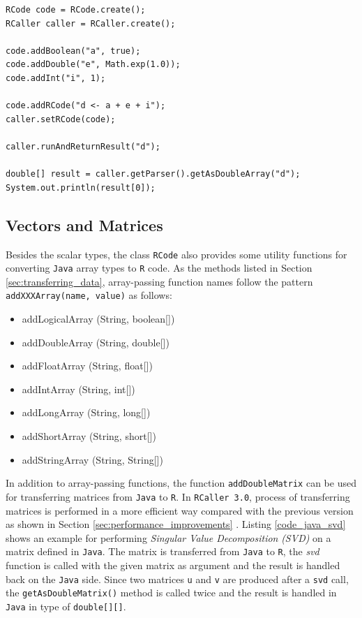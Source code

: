 \documentclass[10pt,a4paper, final, oneside]{article}
\begin{document}
\begin{minipage}{\linewidth}
\begin{lstlisting}[caption=Passing Data,label=code_java_pass_data]
RCode code = RCode.create();
RCaller caller = RCaller.create();
        
code.addBoolean("a", true);
code.addDouble("e", Math.exp(1.0));
code.addInt("i", 1);
        
code.addRCode("d <- a + e + i");
caller.setRCode(code);
       
caller.runAndReturnResult("d");
        
double[] result = caller.getParser().getAsDoubleArray("d");
System.out.println(result[0]);
\end{lstlisting}
\end{minipage}


\subsection{Vectors and Matrices}
\label{sec:vectors_and_matrices}

Besides the scalar types, the class \texttt{RCode} also provides some utility functions for converting \texttt{Java} array types to \texttt{R} code. As the methods listed in Section \ref{sec:transferring_data}, array-passing function names follow the pattern \texttt{addXXXArray(name, value)} as follows:

\begin{itemize}
\item addLogicalArray (String, boolean[])
\item addDoubleArray (String, double[])
\item addFloatArray (String, float[])
\item addIntArray (String, int[])
\item addLongArray (String, long[])
\item addShortArray (String, short[])
\item addStringArray (String, String[])
\end{itemize}

In addition to array-passing functions, the function \texttt{addDoubleMatrix} can be used for transferring matrices from \texttt{Java} to \texttt{R}. In \texttt{RCaller 3.0}, process of transferring matrices is performed in a more efficient way compared with the previous version as shown in Section \ref{sec:performance_improvements} \cite{satman2014rcaller}. Listing \ref{code_java_svd} shows an example for performing \emph{Singular Value Decomposition} \emph{(SVD)} on a matrix defined in \texttt{Java}. The matrix is transferred from \texttt{Java} to \texttt{R}, the \emph{svd} function is called with the given matrix as argument and the result is handled back on the \texttt{Java} side. Since two matrices \texttt{u} and \texttt{v} are produced after a \texttt{svd} call, the \texttt{getAsDoubleMatrix()} method is called twice and the result is handled in \texttt{Java} in type of \texttt{double[][]}.
\end{document}
